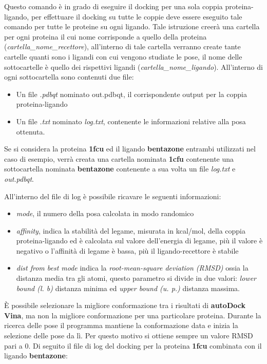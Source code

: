 Questo comando è in grado di eseguire il docking per una sola coppia proteina-ligando, per effettuare il docking su tutte le coppie deve essere eseguito tale comando per tutte le proteine su ogni ligando. Tale istruzione creerà una cartella per ogni proteina il cui nome corrisponde a quello della proteina (\textit{cartella\_nome\_recettore}), all'interno di tale cartella verranno create tante cartelle quanti sono i ligandi con cui vengono studiate le pose, il nome delle sottocartelle è quello dei rispettivi ligandi (\textit{cartella\_nome\_ligando}). All'interno di ogni sottocartella sono contenuti due file:

\begin{itemize}
    \item Un file \textit{.pdbqt} nominato out.pdbqt, il corrispondente output per la coppia proteina-ligando
    \item Un file \textit{.txt} nominato \textit{log.txt}, contenente le informazioni relative alla posa ottenuta. 
\end{itemize}

Se si considera la proteina \textbf{1fcu} ed il ligando \textbf{bentazone} entrambi utilizzati nel caso di esempio, verrà creata una cartella nominata \textbf{1cfu} contenente una sottocartella nominata \textbf{bentazone} contenente a sua volta un file \textit{log.txt} e \textit{out.pdbqt}.

All'interno del file di log è possibile ricavare le seguenti informazioni:

\begin{itemize}
    \item \textit{mode}, il numero della posa calcolata in modo randomico
    \item \textit{affinity}, indica la stabilità del legame, misurata in kcal/mol, della coppia proteina-ligando ed è calcolata sul valore dell'energia di legame, più il valore è negativo o l'affinità di legame è bassa, più il ligando-recettore è stabile
    \item \textit{dist from best mode} indica la \textit{root-mean-square deviation (RMSD)} ossia la distanza media tra gli atomi, questo parametro si divide in due valori: \textit{lower bound (l. b)} distanza minima ed \textit{upper bound (u. p.)} distanza massima.
\end{itemize}

È possibile selezionare la migliore conformazione tra i risultati di \textbf{autoDock Vina}, ma non la migliore conformazione per una particolare proteina. Durante la ricerca delle pose il programma mantiene la conformazione data e inizia la selezione delle pose da lì. Per questo motivo si ottiene sempre un valore RMSD pari a 0. Di seguito il file di log del docking per la proteina \textbf{1fcu} combinata con il ligando \textbf{bentazone}:

